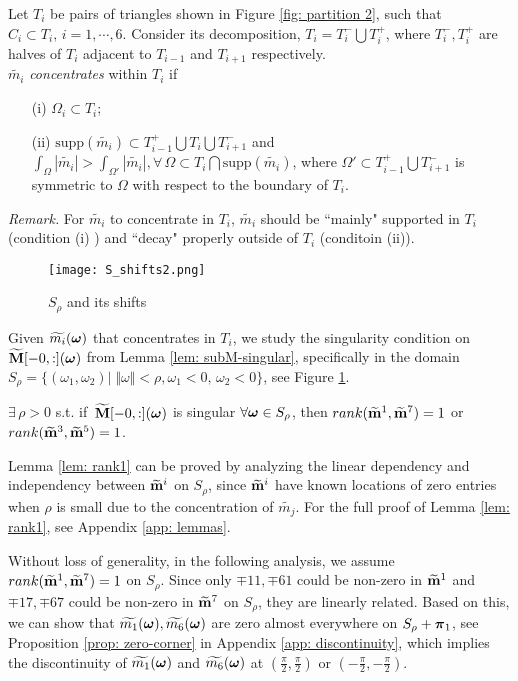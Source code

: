 Let $T_i$ be pairs of triangles shown in Figure \ref{fig: partition 2}, such that $C_i\subset T_i,\, i = 1,\cdots,6.$ Consider its decomposition, $T_i = T_i^-\bigcup T_i^+$, where $T_i^-, T_i^+$ are halves of $T_i$ adjacent  to $T_{i-1}$ and $T_{i+1}$ respectively.\\[.5em]
  $\widetilde{m_i}$ {\it concentrates} within $T_i$ if 
\begin{itemize}
\item[(i)] $\Omega_i\subset T_i$;
\item[(ii)]$\text{supp}(\widetilde{m_i})\subset T_{i-1}^+\bigcup T_i\bigcup T_{i+1}^-$ and $\int_\Omega|\widetilde{m_i}| > \int_{\Omega'}|\widetilde{m_i}|, \forall\, \Omega\subset T_i\bigcap\text{supp}(\widetilde{m_i})$, where $\Omega' \subset T_{i-1}^+\bigcup T_{i+1}^-$ is symmetric to $\Omega$ with respect to the boundary of $T_i$.
\end{itemize}
{\it Remark.}
For $\widetilde{m_i}$ to concentrate in $T_i$, $\widetilde{m_i}$ should be ``mainly" supported in $T_i$ (condition (i) ) and ``decay" properly outside of $T_i$ (conditoin (ii)).

\begin{figure}
\centering
\texttt{[image: S\_shifts2.png]}
\caption{$S_{\rho}$ and its shifts}
\label{fig: S-shifts}
\end{figure}
Given $\widetilde{m_{i}}(\boldsymbol{\omega})$ that concentrates in $T_i$, we study the singularity condition on $\widetilde{\mathbf{M}}[-0,:](\boldsymbol{\omega})$ from Lemma \ref{lem: subM-singular}, specifically in the domain $S_{\rho} = \{(\omega_1,\omega_2)|\;\Vert\omega\Vert < \rho, \omega_1 <0,\,\omega_2<0\}$, see Figure \ref{fig: S-shifts}. 

\begin{lemma}\label{lem: rank1}
$\exists\, \rho>0$ s.t.  if $\,\widetilde{\mathbf{M}}[-0,:](\boldsymbol{\omega})$ is singular $\forall \boldsymbol{\omega}\in S_\rho$, then $rank(\widetilde{\mathbf{m}}^{1},\widetilde{\mathbf{m}}^{7})=1$ or $rank(\widetilde{\mathbf{m}}^{3},\widetilde{\mathbf{m}}^{5}) = 1$.
\end{lemma}
Lemma \ref{lem: rank1} can be proved by analyzing the linear dependency and independency between $\widetilde{\mathbf{m}}^{i}$ on $S_\rho$, since $\widetilde{\mathbf{m}}^{i}$ have known locations of zero entries when $\rho$ is small due to the concentration of $\widetilde{m_j}$.
For the full proof of Lemma \ref{lem: rank1}, see Appendix \ref{app: lemmas}.

Without loss of generality, in the following analysis, we assume $rank(\widetilde{\mathbf{m}}^{1},\widetilde{\mathbf{m}}^{7}) = 1$ on $S_\rho$.
Since only $\mp{1}{1}, \mp{6}{1}$ could be non-zero in $\widetilde{\mathbf{m}}^{1}$ and $\mp{1}{7}, \mp{6}{7}$ could be non-zero in $\widetilde{\mathbf{m}}^{7}$ on $S_\rho$, they are linearly related. Based on this, we can show that $\widetilde{m_{1}}(\boldsymbol{\omega}),\widetilde{m_{6}}(\boldsymbol{\omega})$ are zero almost everywhere on $S_\rho + \boldsymbol{\pi}_1$, see Proposition \ref{prop: zero-corner} in Appendix \ref{app: discontinuity}, which implies the discontinuity of $\widetilde{m_{1}}(\boldsymbol{\omega})$ and $\widetilde{m_{6}}(\boldsymbol{\omega})$ at $(\frac{\pi}{2},\frac{\pi}{2})$ or $(-\frac{\pi}{2},-\frac{\pi}{2})$.

